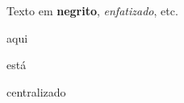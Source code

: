 \documentclass[a5paper,12pt]{memoir}
\begin{document}
Texto em \textbf{negrito}, \emph{enfatizado}, etc.

\begin{center}
aqui

está 

centralizado
\end{center}
\end{document}
